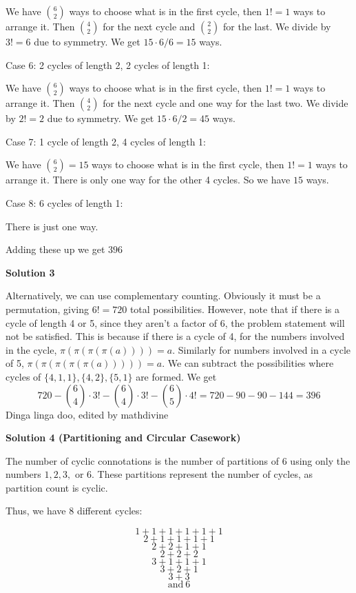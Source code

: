 \begin{enumerate}
 We have $\binom62$ ways to choose what is in the first cycle, then $1! = 1$ ways to arrange it. Then $\binom42$ for the next cycle and $\binom22$ for the last. We divide by $3! = 6$ due to symmetry. We get $15 \cdot 6/6 = 15$ ways.

 Case 6: 2 cycles of length 2, 2 cycles of length 1:

 We have $\binom62$ ways to choose what is in the first cycle, then $1! = 1$ ways to arrange it. Then $\binom42$ for the next cycle and one way for the last two. We divide by $2! = 2$ due to symmetry. We get $15 \cdot 6/2  = 45$ ways.

 Case 7: 1 cycle of length 2, 4 cycles of length 1:

 We have $\binom62=15$ ways to choose what is in the first cycle, then $1! = 1$ ways to arrange it. There is only one way for the other 4 cycles. So we have $15$ ways.

 Case 8: 6 cycles of length 1:

 There is just one way.

 Adding these up we get $\boxed{396}$




\textbf{Solution 3}

Alternatively, we can use complementary counting. Obviously it must be a permutation, giving $6!=720$ total possibilities. However, note that if there is a cycle of length 4 or 5, since they aren't a factor of 6, the problem statement will not be satisfied. This is because if there is a cycle of 4, for the numbers involved in the cycle, $\pi(\pi(\pi(\pi(a))))=a.$ Similarly for numbers involved in a cycle of 5, $\pi(\pi(\pi(\pi(\pi(a)))))=a$. We can subtract the possibilities where cycles of $\{4,1,1\},\{4,2\},\{5,1\}$ are formed. We get
 \[720-\binom64\cdot3!-\binom64\cdot3!-\binom65\cdot4!=720-90-90-144=\boxed{396}\] Dinga linga doo, edited by mathdivine

 



\textbf{Solution 4 (Partitioning and Circular Casework)}

The number of cyclic connotations is the number of partitions of \( 6 \) using only the numbers \( 1, 2, 3, \) or \( 6 \). These partitions represent the number of cycles, as partition count is cyclic.

 Thus, we have 8 different cycles:

 
 \[1+1+1+1+1+1\]
 \[2+1+1+1+1\]
 \[2+2+1+1\]
 \[2+2+2\]
 \[3+1+1+1\]
 \[3+2+1\]
 \[3+3\]
 \[\text{and}~ 6\]


\end{enumerate}
